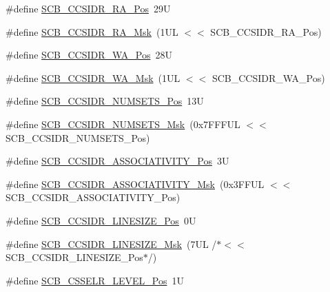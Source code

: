 \begin{DoxyCompactItemize}
\item 
\#define \hyperlink{group___c_m_s_i_s___s_c_b_ga379743eea011cede0032ecb7812b51e1}{S\+C\+B\+\_\+\+C\+C\+S\+I\+D\+R\+\_\+\+R\+A\+\_\+\+Pos}~29U
\item 
\#define \hyperlink{group___c_m_s_i_s___s_c_b_gaa77f28cbf94b44c1114a66e05cc43255}{S\+C\+B\+\_\+\+C\+C\+S\+I\+D\+R\+\_\+\+R\+A\+\_\+\+Msk}~(1\+U\+L $<$$<$ S\+C\+B\+\_\+\+C\+C\+S\+I\+D\+R\+\_\+\+R\+A\+\_\+\+Pos)
\item 
\#define \hyperlink{group___c_m_s_i_s___s_c_b_gade432ae0a64858e92fa35c2983fb47a4}{S\+C\+B\+\_\+\+C\+C\+S\+I\+D\+R\+\_\+\+W\+A\+\_\+\+Pos}~28U
\item 
\#define \hyperlink{group___c_m_s_i_s___s_c_b_ga519ebde5ad64be2098f586bddbc8e898}{S\+C\+B\+\_\+\+C\+C\+S\+I\+D\+R\+\_\+\+W\+A\+\_\+\+Msk}~(1\+U\+L $<$$<$ S\+C\+B\+\_\+\+C\+C\+S\+I\+D\+R\+\_\+\+W\+A\+\_\+\+Pos)
\item 
\#define \hyperlink{group___c_m_s_i_s___s_c_b_ga1028d2c238f74d2aa021f53ffbe8d7ab}{S\+C\+B\+\_\+\+C\+C\+S\+I\+D\+R\+\_\+\+N\+U\+M\+S\+E\+T\+S\+\_\+\+Pos}~13U
\item 
\#define \hyperlink{group___c_m_s_i_s___s_c_b_ga47d1f01185d7a039334031008386c5a8}{S\+C\+B\+\_\+\+C\+C\+S\+I\+D\+R\+\_\+\+N\+U\+M\+S\+E\+T\+S\+\_\+\+Msk}~(0x7\+F\+F\+F\+U\+L $<$$<$ S\+C\+B\+\_\+\+C\+C\+S\+I\+D\+R\+\_\+\+N\+U\+M\+S\+E\+T\+S\+\_\+\+Pos)
\item 
\#define \hyperlink{group___c_m_s_i_s___s_c_b_gae67f2f83976b819fb3039fc35cfef0fb}{S\+C\+B\+\_\+\+C\+C\+S\+I\+D\+R\+\_\+\+A\+S\+S\+O\+C\+I\+A\+T\+I\+V\+I\+T\+Y\+\_\+\+Pos}~3U
\item 
\#define \hyperlink{group___c_m_s_i_s___s_c_b_gae093c4c635dad43845967512fa87173a}{S\+C\+B\+\_\+\+C\+C\+S\+I\+D\+R\+\_\+\+A\+S\+S\+O\+C\+I\+A\+T\+I\+V\+I\+T\+Y\+\_\+\+Msk}~(0x3\+F\+F\+U\+L $<$$<$ S\+C\+B\+\_\+\+C\+C\+S\+I\+D\+R\+\_\+\+A\+S\+S\+O\+C\+I\+A\+T\+I\+V\+I\+T\+Y\+\_\+\+Pos)
\item 
\#define \hyperlink{group___c_m_s_i_s___s_c_b_ga750388e1509b36d35568a68a7a1e1ff7}{S\+C\+B\+\_\+\+C\+C\+S\+I\+D\+R\+\_\+\+L\+I\+N\+E\+S\+I\+Z\+E\+\_\+\+Pos}~0U
\item 
\#define \hyperlink{group___c_m_s_i_s___s_c_b_ga07b3bdffe4c289b9c19c70cf698499da}{S\+C\+B\+\_\+\+C\+C\+S\+I\+D\+R\+\_\+\+L\+I\+N\+E\+S\+I\+Z\+E\+\_\+\+Msk}~(7\+U\+L /$\ast$$<$$<$ S\+C\+B\+\_\+\+C\+C\+S\+I\+D\+R\+\_\+\+L\+I\+N\+E\+S\+I\+Z\+E\+\_\+\+Pos$\ast$/)
\item 
\#define \hyperlink{group___c_m_s_i_s___s_c_b_ga8c014c9678bc9072f10459a1e14b973c}{S\+C\+B\+\_\+\+C\+S\+S\+E\+L\+R\+\_\+\+L\+E\+V\+E\+L\+\_\+\+Pos}~1U

\end{DoxyCompactItemize}
